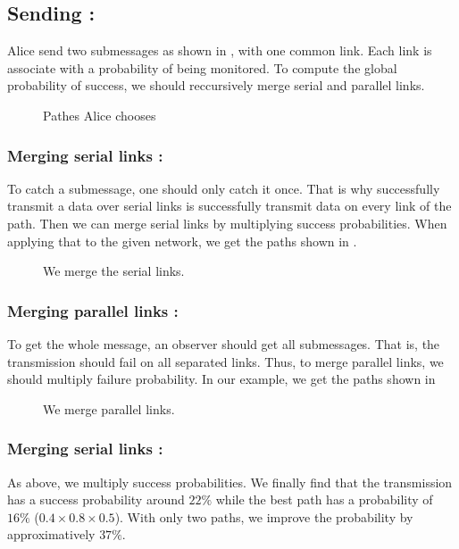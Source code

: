 \documentclass[a4paper, onecolumn, 10pt]{article}
\numberwithin{equation}{section}
\begin{document}
\subsection{Sending :}
Alice send two submessages as shown in , with one common link. Each link is associate with a probability of being monitored. To compute the global probability of success, we should reccursively merge serial and parallel links.
\begin{figure}[h]
  \begin{center}
    
    \caption{Pathes Alice chooses}
    \label{fig:example}
  \end{center}
\end{figure}
\subsubsection{Merging serial links :}
To catch a submessage, one should only catch it once. That is why successfully transmit a data over serial links is successfully transmit data on every link of the path. Then we can merge serial links by multiplying success probabilities. When applying that to the given network, we get the paths shown in .
\begin{figure}[h]
  \begin{center}
    
    \caption{We merge the serial links.}
    \label{fig:example2}
  \end{center}
\end{figure}
\subsubsection{Merging parallel links :}
To get the whole message, an observer should get all submessages. That is, the transmission should fail on all separated links. Thus, to merge parallel links, we should multiply failure probability. In our example, we get the paths shown in 
\begin{figure}[h]
  \begin{center}
    
    \caption{We merge parallel links.}
    \label{fig:example3}
  \end{center}
\end{figure}
\subsubsection{Merging serial links :}
As above, we multiply success probabilities. We finally find that the transmission has a success probability around $22\%$ while the best path has a probability of $16\%$ ($0.4\times 0.8\times 0.5$). With only two paths, we improve the probability by approximatively $37\%$.
\end{document}
